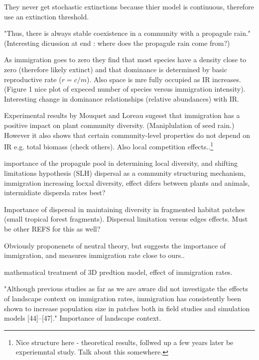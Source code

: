 \begin{itemize}
They never get stochastic extinctions because thier model is continuous, therefore use an extinction threshold.

"Thus, there is always stable coexistence in a community
with a propagule rain." (Interesting dicussion at end : where does the propagule rain come from?)

As immigration goes to zero they find that most species have a density close to zero (therefore likely extinct) and that dominance is determined by  basic reproductive rate ($r=c/m$). Also space is mre fully occupied as IR increases. (Figure 1 nice plot of expeced number of species versus immigration intensity). Interesting change in dominance relationships (relative abundances) with IR. 

Experimental results by Mouquet and Loreau \cite{mouquet2004immigration} sugesst that immigration has a positive impact on plant community diversity. (Maniplulation of seed rain.) However  it also shows that certain community-level properties do not depend on IR e.g. total biomass (check others). Also local competition effects..\footnote{Nice structure here - theoretical results, follwed up a few years later be experiemntal study. Talk about this somewhere.}

\cite{foster2004propagule} importance of the propagule pool in determining local diversity, and shifting limitations hypothesis (SLH)
\cite{cadotte2006dispersal} dispersal as a community structuring mechanism, immigration increasing locxal diversity, effect difers between plants and animals, intermidiate dispersla rates best?

\cite{zartman2006habitat} Importance of dispersal in maintaining diversity in fragmented habitat patches (small tropical forest fragments). Dispersal limitation versus edges effects. Must be other REFS for this as well?

\cite{condit2012thirty} Obviously proponenets of neutral theory, but suggests the importance of immigration, and measures immigration rate close to ours..

\cite{drury2015immigration} mathematical treatment of 3D predtion model, effect of immigration rates. 

\cite{puettker2011immigration} "Although previous studies as far as we are aware did not investigate the effects of landscape context on immigration rates, immigration has consistently been shown to increase population size in patches both in field studies and simulation models [44]–[47]."  Importance of landscape context.


\end{itemize}
